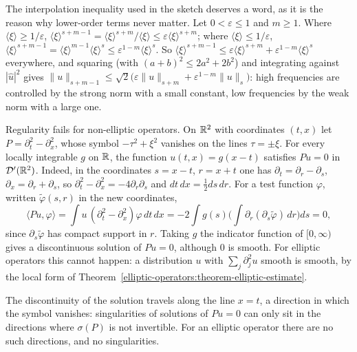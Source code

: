 The interpolation inequality used in the sketch deserves a word, as it is the reason why lower-order terms never matter. Let $0 < \varepsilon \leq 1$ and $m \geq 1$. Where
$\langle\xi\rangle \geq 1/\varepsilon$, $\langle\xi\rangle^{s+m-1} = \langle\xi\rangle^{s+m}/\langle\xi\rangle \leq \varepsilon\langle\xi\rangle^{s+m}$; where $\langle\xi\rangle \leq 1/\varepsilon$,
$\langle\xi\rangle^{s+m-1} = \langle\xi\rangle^{m-1}\langle\xi\rangle^s \leq \varepsilon^{1-m}\langle\xi\rangle^s$. So $\langle\xi\rangle^{s+m-1} \leq \varepsilon\langle\xi\rangle^{s+m} + \varepsilon^{1-m}\langle\xi\rangle^s$ everywhere, and
squaring (with $(a + b)^2 \leq 2a^2 + 2b^2$) and integrating against $|\hat u|^2$ gives $\|u\|_{s+m-1} \leq \sqrt2\bigl(\varepsilon\|u\|_{s+m} + \varepsilon^{1-m}\|u\|_s\bigr)$: high frequencies are controlled by
the strong norm with a small constant, low frequencies by the weak norm with a large one.

\begin{counterexample}\label{elliptic-operators:counterexample-wave}
Regularity fails for non-elliptic operators. On $\mathbb{R}^2$ with coordinates $(t, x)$ let $P = \partial_t^2 - \partial_x^2$, whose symbol $-\tau^2 + \xi^2$ vanishes on the lines $\tau = \pm\xi$. For every locally integrable $g$ on $\mathbb{R}$,
the function $u(t, x) = g(x - t)$ satisfies $Pu = 0$ in $\mathcal{D}'(\mathbb{R}^2)$. Indeed, in the coordinates $s = x - t$, $r = x + t$ one has $\partial_t = \partial_r - \partial_s$, $\partial_x = \partial_r + \partial_s$, so
$\partial_t^2 - \partial_x^2 = -4\partial_r\partial_s$ and $dt\,dx = \frac12ds\,dr$. For a test function $\varphi$, written $\tilde\varphi(s, r)$ in the new coordinates,
\[
\langle Pu, \varphi\rangle = \int u\,(\partial_t^2 - \partial_x^2)\varphi\,dt\,dx = -2\int g(s)\Big(\int\partial_r(\partial_s\tilde\varphi)\,dr\Big)ds = 0,
\]
since $\partial_s\tilde\varphi$ has compact support in $r$. Taking $g$ the indicator function of $[0, \infty)$ gives a discontinuous solution of $Pu = 0$, although $0$ is smooth. For elliptic operators this cannot happen: a
distribution $u$ with $\sum_j\partial_j^2u$ smooth is smooth, by the local form of Theorem~\ref{elliptic-operators:theorem-elliptic-estimate}.
\end{counterexample}

The discontinuity of the solution travels along the line $x = t$, a direction in which the symbol vanishes: singularities of solutions of $Pu = 0$ can only sit in the directions where
$\sigma(P)$ is not invertible. For an elliptic operator there are no such directions, and no singularities.

